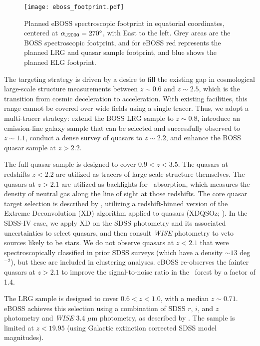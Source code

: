 \begin{figure}[t!]
\centering
\texttt{[image: eboss\_footprint.pdf]}
\caption{ \label{fig:eboss_footprint}
Planned eBOSS spectroscopic footprint in equatorial coordinates,
centered at $\alpha_{\rm J2000} = 270^\circ$, with East to the left.
Grey areas are the BOSS spectroscopic footprint, and for eBOSS red
represents the planned LRG and quasar sample footprint, and blue shows
the planned ELG footprint.}
\end{figure}

The targeting strategy is driven by a desire to fill the existing gap
in cosmological large-scale structure measurements between $z\sim 0.6$
and $z\sim 2.5$, which is the transition from cosmic deceleration to
acceleration. With existing facilities, this range cannot be covered
over wide fields using a single tracer. Thus, we adopt a multi-tracer
strategy: extend the BOSS LRG sample to $z\sim 0.8$, introduce an
emission-line galaxy sample that can be selected and successfully
observed to $z\sim 1.1$, conduct a dense survey of quasars to $z\sim
2.2$, and enhance the BOSS quasar sample at $z>2.2$.
 
The full quasar sample is designed to cover $0.9<z<3.5$. The quasars
at redshifts $z<2.2$ are utilized as tracers of large-scale structure
themselves.  The quasars at $z>2.1$ are utilized as backlights for
\lya\ absorption, which measures the density of neutral gas
along the line of sight at those redshifts.  The core quasar target
selection is described by \citet{myers15a}, utilizing a redshift-binned
version of the Extreme Deconvolution (XD) algorithm applied to quasars
(XDQSOz; \citet{bovy11a, bovy12b}).  In the SDSS-IV case, we apply
XD on the SDSS photometry and its associated uncertainties to select
quasars, and then consult {\it WISE} photometry to veto sources likely to be
stars.  We do not observe quasars at $z<2.1$ that were
spectroscopically classified in prior SDSS surveys (which have a
density $\sim 13$ deg$^{-2}$), but these are included in
clustering analyses. eBOSS re-observes the fainter quasars at $z>2.1$ to
improve the signal-to-noise ratio in the \lya\ forest by a factor of
1.4.

The LRG sample is designed to cover $0.6<z<1.0$, with a median $z\sim
0.71$. eBOSS achieves this selection using a combination of SDSS $r$,
$i$, and $z$ photometry and {\it WISE} 3.4 $\mu$m photometry, as
described by
\citet{prakash15a}. The sample is limited at $z<19.95$ (using
Galactic extinction corrected SDSS model magnitudes).

